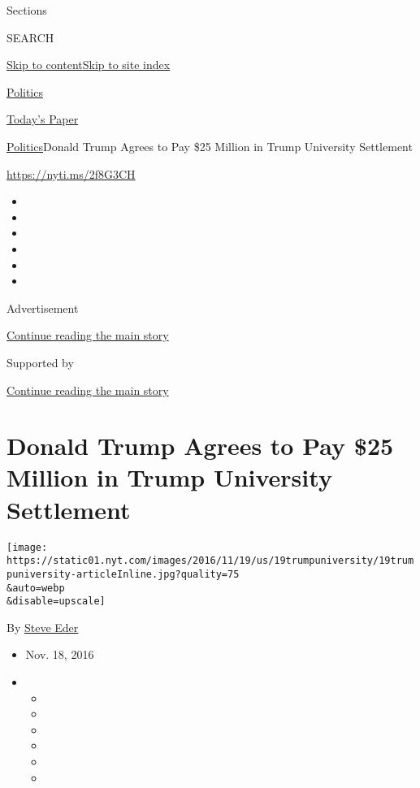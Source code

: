 Sections

SEARCH

\protect\hyperlink{site-content}{Skip to
content}\protect\hyperlink{site-index}{Skip to site index}

\href{https://www.nytimes.com/section/politics}{Politics}

\href{https://myaccount.nytimes.com/auth/login?response_type=cookie\&client_id=vi}{}

\href{https://www.nytimes.com/section/todayspaper}{Today's Paper}

\href{/section/politics}{Politics}\textbar{}Donald Trump Agrees to Pay
\$25 Million in Trump University Settlement

\url{https://nyti.ms/2f8G3CH}

\begin{itemize}
\item
\item
\item
\item
\item
\item
\end{itemize}

Advertisement

\protect\hyperlink{after-top}{Continue reading the main story}

Supported by

\protect\hyperlink{after-sponsor}{Continue reading the main story}

\hypertarget{donald-trump-agrees-to-pay-25-million-in-trump-university-settlement}{%
\section{Donald Trump Agrees to Pay \$25 Million in Trump University
Settlement}\label{donald-trump-agrees-to-pay-25-million-in-trump-university-settlement}}

\texttt{[image: https://static01.nyt.com/images/2016/11/19/us/19trumpuniversity/19trumpuniversity-articleInline.jpg?quality=75\\\&auto=webp\\\&disable=upscale]}

By \href{http://www.nytimes.com/by/steve-eder}{Steve Eder}

\begin{itemize}
\item
  Nov. 18, 2016
\item
  \begin{itemize}
  \item
  \item
  \item
  \item
  \item
  \item
  \end{itemize}
\end{itemize}

